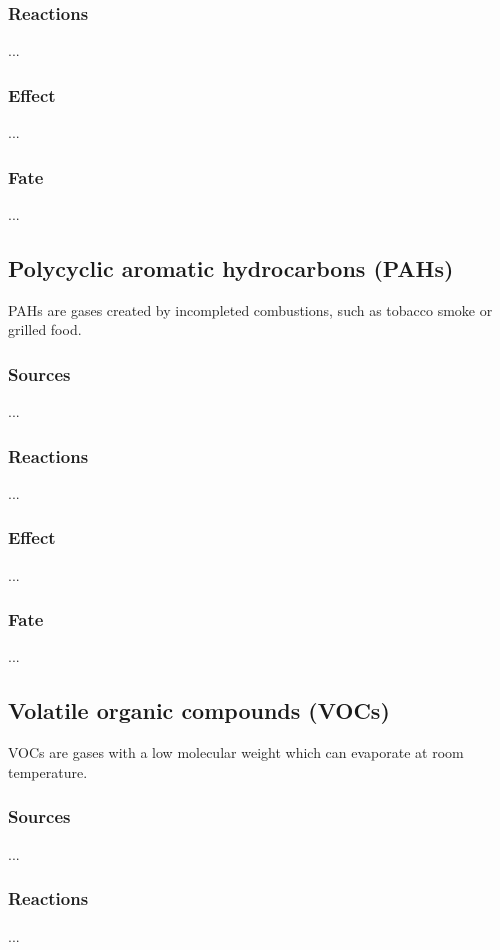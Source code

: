 \documentclass{article}
\begin{document}
\subsubsection{Reactions}
...

\subsubsection{Effect}
...

\subsubsection{Fate}
... 

\subsection{Polycyclic aromatic hydrocarbons (PAHs)}
PAHs are gases created by incompleted combustions, such as tobacco smoke
or grilled food.

\subsubsection{Sources}
...

\subsubsection{Reactions}
...

\subsubsection{Effect}
...

\subsubsection{Fate}
... 

\subsection{Volatile organic compounds (VOCs)}
VOCs are gases with a low molecular weight which can evaporate at room temperature.

\subsubsection{Sources}
...

\subsubsection{Reactions}
...
\end{document}
